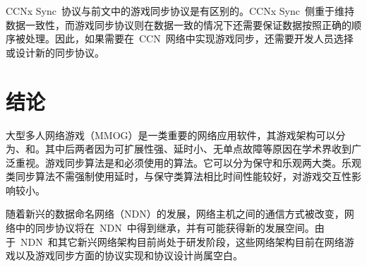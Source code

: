 CCNx Sync~协议与前文中的游戏同步协议是有区别的。CCNx Sync~侧重于维持数据一致性，而游戏同步协议则在数据一致的情况下还需要保证数据按照正确的顺序被处理。因此，如果需要在~CCN~网络中实现游戏同步，还需要开发人员选择或设计新的同步协议。



\section{结论}

大型多人网络游戏（MMOG）是一类重要的网络应用软件，其游戏架构可以分为{\csa}、{\pa}和{\da}。其中后两者因为可扩展性强、延时小、无单点故障等原因在学术界收到广泛重视。游戏同步算法是{\pa}和{\da}必须使用的算法。它可以分为保守和乐观两大类。乐观类同步算法不需强制使用延时，与保守类算法相比时间性能较好，对游戏交互性影响较小。

随着新兴的数据命名网络（NDN）的发展，网络主机之间的通信方式被改变，网络中的同步协议将在~NDN~中得到继承，并有可能获得新的发展空间。由于~NDN~和其它新兴网络架构目前尚处于研发阶段，这些网络架构目前在网络游戏以及游戏同步方面的协议实现和协议设计尚属空白。









